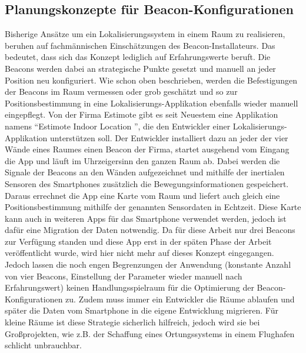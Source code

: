 \subsection{Planungskonzepte für Beacon-Konfigurationen}
Bisherige Ansätze um ein Lokalisierungssystem in einem Raum zu realisieren, beruhen auf fachmännischen Einschätzungen des Beacon-Installateurs. Das bedeutet, dass sich das Konzept lediglich auf Erfahrungswerte beruft. Die Beacons werden dabei an strategische Punkte gesetzt und manuell an jeder Position neu konfiguriert. Wie schon oben beschrieben, werden die Befestigungen der Beacons im Raum vermessen oder grob geschätzt und so zur Positionsbestimmung in eine Lokalisierungs-Applikation ebenfalls wieder manuell eingepflegt. Von der Firma Estimote gibt es seit Neuestem eine Applikation namens "`Estimote Indoor Location "', die den Entwickler einer Lokalisierungs-Applikation unterstützen soll. Der Entwickler installiert dazu an jeder der vier Wände eines Raumes einen Beacon der Firma, startet ausgehend vom Eingang die App und läuft im Uhrzeigersinn den ganzen Raum ab. Dabei werden die Signale der Beacons an den Wänden aufgezeichnet und mithilfe der inertialen Sensoren des Smartphones zusätzlich die Bewegungsinformationen gespeichert. Daraus errechnet die App eine Karte vom Raum und liefert auch gleich eine Positionsbestimmung mithilfe der genannten Sensordaten in Echtzeit. Diese Karte kann auch in weiteren Apps für das Smartphone verwendet werden, jedoch ist dafür eine Migration der Daten notwendig. Da für diese Arbeit nur drei Beacons zur Verfügung standen und diese App erst in der späten Phase der Arbeit veröffentlicht wurde, wird hier nicht mehr auf dieses Konzept eingegangen. Jedoch lassen die noch engen Begrenzungen der Anwendung (konstante Anzahl von vier Beacons, Einstellung der Parameter wieder manuell nach Erfahrungswert) keinen Handlungsspielraum für die Optimierung der Beacon-Konfigurationen zu. Zudem muss immer ein Entwickler die Räume ablaufen und später die Daten vom Smartphone in die eigene Entwicklung migrieren. Für kleine Räume ist diese Strategie sicherlich hilfreich, jedoch wird sie bei Großprojekten, wie z.B. der Schaffung eines Ortungssystems in einem Flughafen schlicht unbrauchbar.
